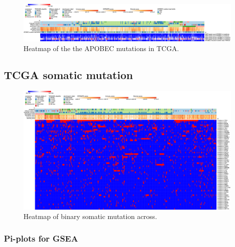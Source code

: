 \begin{figure}[!htb]   
\centering
\includegraphics[width=1.0\textwidth,height=1.0\textheight,keepaspectratio]{Sections/Network_I/Resources/selective_pruning/sel_tfs_apobec_meta.png}
  \caption{Heatmap of the the APOBEC mutations in TCGA.}
\label{fig:ap:sel_tfs_tcga_meta_apobec}
\end{figure}

\newpage 

\subsection{TCGA somatic mutation}

\begin{figure}[!htb]   
\centering
\includegraphics[width=1.0\textwidth,height=1.0\textheight,keepaspectratio]{Sections/Network_I/Resources/selective_pruning/sel_tfs_mut_meta.png}
  \caption{Heatmap of binary somatic mutation across.}
\label{fig:ap:sel_tfs_tcga_meta_mut}
\end{figure}

\newpage

\subsubsection{Pi-plots for GSEA} \label{s:ap:sel_prun_pi}


